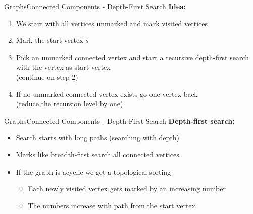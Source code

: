
\begin{frame}{Graphs}{Connected Components - Depth-First Search}
  \textbf{Idea:}
  \begin{enumerate}
    \item<2->
      We start with all vertices unmarked and
      {\color{Mittel-Blau}mark visited vertices}
    \item<3->
      Mark the start vertex {\color{Mittel-Blau}$s$}
    \item<4->
      Pick an unmarked {\color{Mittel-Blau}connected vertex} and start a
      {\color{Mittel-Blau}recursive depth-first search} with the vertex as
      start vertex\\
      (continue on step 2)
    \item<5->
      If no unmarked connected vertex exists go one vertex back\\
      (reduce the recursion level by one)
  \end{enumerate}
\end{frame}


\begin{frame}{Graphs}{Connected Components - Depth-First Search}
  \textbf{Depth-first search:}
  \begin{itemize}
    \item<2->
      Search starts with {\color{Mittel-Blau}long paths} (searching with depth)
    \item<3->
      Marks like {\color{Mittel-Blau}breadth-first search} all connected
      vertices
    \item<4->
      If the graph is acyclic we get a {\color{Mittel-Blau}topological sorting}
      \begin{itemize}
        \item<5->
          Each newly visited vertex gets marked by an increasing number
        \item<6->
          The numbers increase with path from the start vertex
      \end{itemize}
  \end{itemize}
\end{frame}


